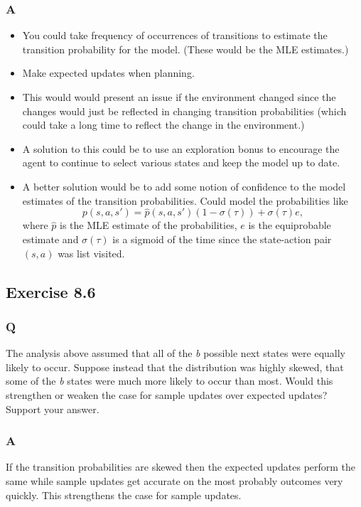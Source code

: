 \subsubsection*{A}
\begin{itemize}
    \item You could take frequency of occurrences of transitions to estimate the transition probability for the model. (These would be the MLE estimates.)
    \item Make expected updates when planning.
    \item This would would present an issue if the environment changed since the changes would just be reflected in changing transition probabilities (which could take a long time to reflect the change in the environment.)
    \item A solution to this could be to use an exploration bonus to encourage the agent to continue to select various states and keep the model up to date.
    \item A better solution would be to add some notion of confidence to the model estimates of the transition probabilities. Could model the probabilities like 
    \[ 
        p(s, a, s') = \hat{p}(s, a, s')(1 - \sigma(\tau)) + \sigma(\tau)e,
    \]
    where $\hat{p}$ is the MLE estimate of the probabilities, $e$ is the equiprobable estimate and $\sigma(\tau)$ is a sigmoid of the time since the state-action pair $(s, a)$ was list visited.
\end{itemize}

\subsection{Exercise 8.6}
\subsubsection*{Q}
The analysis above assumed that all of the \emph{b} possible next states were equally likely to occur. Suppose instead that the distribution was highly skewed, that some of the \emph{b} states were much more likely to occur than most. Would this strengthen or weaken the case for sample updates over expected updates? Support your answer.
\subsubsection*{A}
If the transition probabilities are skewed then the expected updates perform the same while sample updates get accurate on the most probably outcomes very quickly. This strengthens the case for sample updates.


